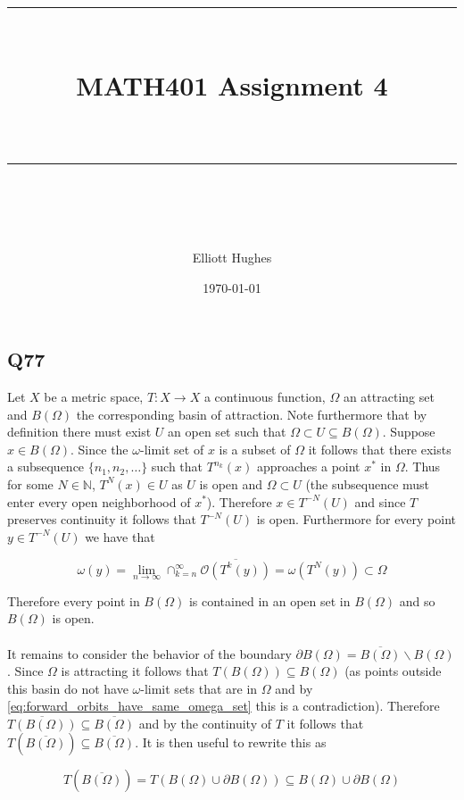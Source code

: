 \documentclass{article}
\title{	
	\normalfont\normalsize 
	\rule{\linewidth}{0.5pt}\\ %
	\vspace{14pt} %
	{\LARGE MATH401 Assignment 4 \\ %
    \large \textit{} \\}
	\vspace{6pt} %
	\rule{\linewidth}{1pt}\\ %
}
\author{Elliott Hughes}
\date{\normalsize\today}
\begin{document}
\maketitle

\subsection*{Q77}
Let $X$ be a metric space, $T:X \rightarrow X$ a continuous function, $\Omega$ an attracting set 
and $B(\Omega)$ the corresponding basin of attraction. Note furthermore that by definition there 
must exist $U$ an open set such that $\Omega \subset U \subseteq B(\Omega)$. 
Suppose $x \in B(\Omega)$. Since the $\omega$-limit set of $x$ is a subset of $\Omega$ it follows that 
there exists a subsequence $\{n_1,n_2,\dots\}$ such 
that $T^{n_k}(x)$ approaches a point $x^*$ in $\Omega$. Thus for some $N \in \mathbb{N}$, $T^N(x) \in U$ 
as $U$ is open and $\Omega \subset U$ (the subsequence must enter every open neighborhood of 
$x^*$). Therefore $x \in T^{-N}(U)$ and since $T$ preserves continuity it follows that $T^{-N}(U)$ 
is open. Furthermore for every point $y \in T^{-N}(U)$ we have that

\begin{equation}\label{eq:forward_orbits_have_same_omega_set}
	\omega(y) = \lim_{n \rightarrow \infty} \cap_{k =n}^\infty \overline{\mathcal{O}(T^k(y))} = \omega(T^N(y)) \subset \Omega
\end{equation}

Therefore every point in $B(\Omega)$ is contained in an open set in $B(\Omega)$ and so $B(\Omega)$ is 
open. 

\paragraph{}
It remains to consider the behavior of the boundary $\partial B(\Omega) = \overline{B(\Omega)}\backslash B(\Omega)$. 
Since $\Omega$ is attracting it follows that $T(B(\Omega)) \subseteq B(\Omega)$ (as points outside 
this basin do not have $\omega$-limit sets that are in $\Omega$ and by \autoref{eq:forward_orbits_have_same_omega_set} 
this is a contradiction). Therefore $\overline{T(B(\Omega))} \subseteq \overline{B(\Omega)}$ 
and by the continuity of $T$ it follows that $T(\overline{B(\Omega)}) \subseteq \overline{B(\Omega)}$. It is then 
useful to rewrite this as 

\begin{equation*}
	T(\overline{B(\Omega)}) = T(B(\Omega) \cup \partial B(\Omega)) \subseteq B(\Omega) \cup \partial B(\Omega)
\end{equation*}
\end{document}

